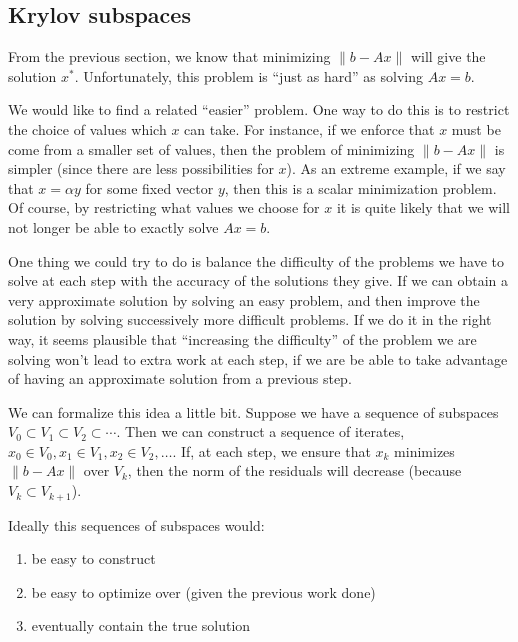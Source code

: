\documentclass[10pt]{article}
\providecommand{\tightlist}{%
  \setlength{\itemsep}{0pt}\setlength{\parskip}{0pt}}
\begin{document}
\subsection{Krylov subspaces}

From the previous section, we know that minimizing \(\|b-Ax\|\) will give the solution \(x^*\).
Unfortunately, this problem is ``just as hard'' as solving \(Ax=b\).

We would like to find a related ``easier'' problem.
One way to do this is to restrict the choice of values which \(x\) can take.
For instance, if we enforce that \(x\) must be come from a smaller set of values, then the problem of minimizing \(\|b-Ax\|\) is simpler (since there are less possibilities for \(x\)).
As an extreme example, if we say that \(x = \alpha y\) for some fixed vector \(y\), then this is a scalar minimization problem.
Of course, by restricting what values we choose for \(x\) it is quite likely that we will not longer be able to exactly solve \(Ax=b\).

One thing we could try to do is balance the difficulty of the problems we have to solve at each step with the accuracy of the solutions they give.
If we can obtain a very approximate solution by solving an easy problem, and then improve the solution by solving successively more difficult problems.
If we do it in the right way, it seems plausible that ``increasing the difficulty'' of the problem we are solving won't lead to extra work at each step, if we are be able to take advantage of having an approximate solution from a previous step.

We can formalize this idea a little bit.
Suppose we have a sequence of subspaces \(V_0\subset V_1\subset V_2\subset \cdots\).
Then we can construct a sequence of iterates, \(x_0\in V_0, x_1\in V_1,x_2\in V_2, \ldots\).
If, at each step, we ensure that \(x_k\) minimizes \(\|b-Ax\|\) over \(V_k\), then the norm of the residuals will decrease (because \(V_k \subset V_{k+1}\)).

Ideally this sequences of subspaces would:

\begin{enumerate}
\def\labelenumi{\arabic{enumi}.}
\tightlist
\item
  be easy to construct
\item
  be easy to optimize over (given the previous work done)
\item
  eventually contain the true solution
\end{enumerate}
\end{document}
